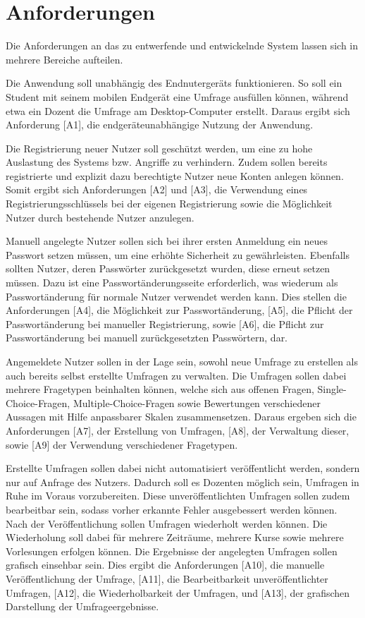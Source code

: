 \section{Anforderungen}
\label{sec:Anforderungen}

Die Anforderungen an das zu entwerfende und entwickelnde System lassen sich in mehrere Bereiche aufteilen.

Die Anwendung soll unabhängig des Endnutergeräts funktionieren.
So soll ein Student mit seinem mobilen Endgerät eine Umfrage ausfüllen können, während etwa ein Dozent die Umfrage am Desktop-Computer erstellt.
Daraus ergibt sich Anforderung [A1], die endgeräteunabhängige Nutzung der Anwendung.

Die Registrierung neuer Nutzer soll geschützt werden, um eine zu hohe Auslastung des Systems bzw. Angriffe zu verhindern.
Zudem sollen bereits registrierte und explizit dazu berechtigte Nutzer neue Konten anlegen können.
Somit ergibt sich Anforderungen [A2] und [A3], die Verwendung eines Registrierungsschlüssels bei der eigenen Registrierung sowie die Möglichkeit Nutzer durch bestehende Nutzer anzulegen.

Manuell angelegte Nutzer sollen sich bei ihrer ersten Anmeldung ein neues Passwort setzen müssen, um eine erhöhte Sicherheit zu gewährleisten.
Ebenfalls sollten Nutzer, deren Passwörter zurückgesetzt wurden, diese erneut setzen müssen.
Dazu ist eine Passwortänderungsseite erforderlich, was wiederum als Passwortänderung für normale Nutzer verwendet werden kann.
Dies stellen die Anforderungen [A4], die Möglichkeit zur Passwortänderung, [A5], die Pflicht der Passwortänderung bei manueller Registrierung, sowie [A6], die Pflicht zur Passwortänderung bei manuell zurückgesetzten Passwörtern, dar.

Angemeldete Nutzer sollen in der Lage sein, sowohl neue Umfrage zu erstellen als auch bereits selbst erstellte Umfragen zu verwalten.
Die Umfragen sollen dabei mehrere Fragetypen beinhalten können, welche sich aus offenen Fragen, Single-Choice-Fragen, Multiple-Choice-Fragen sowie Bewertungen verschiedener Aussagen mit Hilfe anpassbarer Skalen zusammensetzen.
Daraus ergeben sich die Anforderungen [A7], der Erstellung von Umfragen, [A8], der Verwaltung dieser, sowie [A9] der Verwendung verschiedener Fragetypen.

Erstellte Umfragen sollen dabei nicht automatisiert veröffentlicht werden, sondern nur auf Anfrage des Nutzers.
Dadurch soll es Dozenten möglich sein, Umfragen in Ruhe im Voraus vorzubereiten.
Diese unveröffentlichten Umfragen sollen zudem bearbeitbar sein, sodass vorher erkannte Fehler ausgebessert werden können.
Nach der Veröffentlichung sollen Umfragen wiederholt werden können.
Die Wiederholung soll dabei für mehrere Zeiträume, mehrere Kurse sowie mehrere Vorlesungen erfolgen können.
Die Ergebnisse der angelegten Umfragen sollen grafisch einsehbar sein.
Dies ergibt die Anforderungen [A10], die manuelle Veröffentlichung der Umfrage, [A11], die Bearbeitbarkeit unveröffentlichter Umfragen, [A12], die Wiederholbarkeit der Umfragen, und [A13], der grafischen Darstellung der Umfrageergebnisse.

